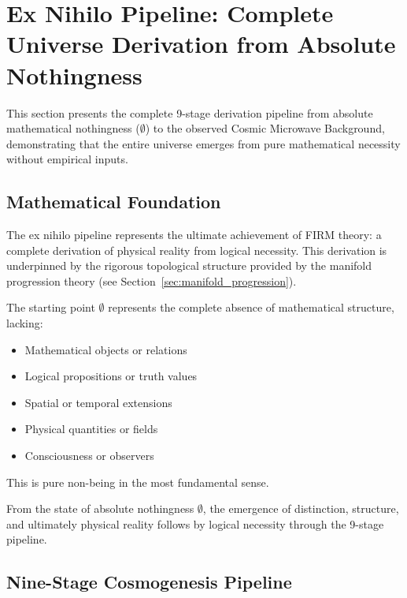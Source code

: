 \section{Ex Nihilo Pipeline: Complete Universe Derivation from Absolute Nothingness}

This section presents the complete 9-stage derivation pipeline from absolute mathematical nothingness ($\emptyset$) to the observed Cosmic Microwave Background, demonstrating that the entire universe emerges from pure mathematical necessity without empirical inputs.

\subsection{Mathematical Foundation}

The ex nihilo pipeline represents the ultimate achievement of FIRM theory: a complete derivation of physical reality from logical necessity. This derivation is underpinned by the rigorous topological structure provided by the manifold progression theory (see Section~\ref{sec:manifold_progression}).

\begin{definition}
The starting point $\emptyset$ represents the complete absence of mathematical structure, lacking:
\begin{itemize}
\item Mathematical objects or relations
\item Logical propositions or truth values  
\item Spatial or temporal extensions
\item Physical quantities or fields
\item Consciousness or observers
\end{itemize}
This is pure non-being in the most fundamental sense.
\end{definition}

\begin{theorem}
From the state of absolute nothingness $\emptyset$, the emergence of distinction, structure, and ultimately physical reality follows by logical necessity through the 9-stage pipeline.
\end{theorem}

\subsection{Nine-Stage Cosmogenesis Pipeline}

